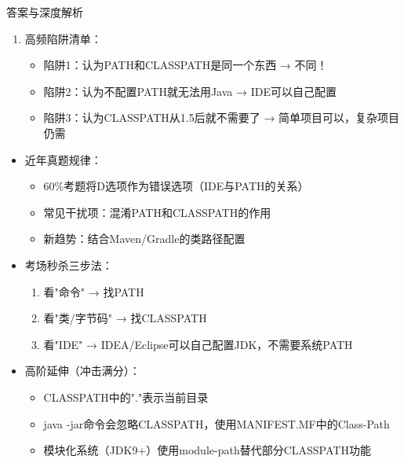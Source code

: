 \documentclass[12pt, a4paper]{ctexart}
\begin{document}
\begin{enumerate}[label=\textbf{\arabic*.}]
\begin{bluebox}{答案与深度解析}
\begin{enumerate}[leftmargin=*, nosep]
			      \item 高频陷阱清单：
			            \begin{itemize}
				            \item 陷阱1：认为PATH和CLASSPATH是同一个东西 → 不同！
				            \item 陷阱2：认为不配置PATH就无法用Java → IDE可以自己配置
				            \item 陷阱3：认为CLASSPATH从1.5后就不需要了 → 简单项目可以，复杂项目仍需
			            \end{itemize}
		      \end{enumerate}

		      \begin{itemize}[leftmargin=*, nosep]
			      \item 近年真题规律：
			            \begin{itemize}
				            \item 60\%考题将D选项作为错误选项（IDE与PATH的关系）
				            \item 常见干扰项：混淆PATH和CLASSPATH的作用
				            \item 新趋势：结合Maven/Gradle的类路径配置
			            \end{itemize}

			      \item 考场秒杀三步法：
			            \begin{enumerate}
				            \item 看"命令" → 找PATH
				            \item 看"类/字节码" → 找CLASSPATH
				            \item 看"IDE" → IDEA/Eclipse可以自己配置JDK，不需要系统PATH
			            \end{enumerate}

			      \item 高阶延伸（冲击满分）：
			            \begin{itemize}
				            \item CLASSPATH中的"."表示当前目录
				            \item java -jar命令会忽略CLASSPATH，使用MANIFEST.MF中的Class-Path
				            \item 模块化系统（JDK9+）使用module-path替代部分CLASSPATH功能
			            \end{itemize}
		      \end{itemize}
	      \end{bluebox}


\end{enumerate}
\end{document}
